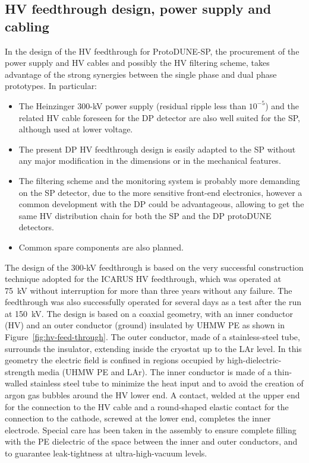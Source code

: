 
\subsection{HV feedthrough design, power supply and cabling}
In the design of the HV feedthrough for ProtoDUNE-SP, the procurement of the power supply and HV cables and possibly the HV filtering scheme, takes advantage of the strong synergies between the single phase and dual phase prototypes. In particular:

\begin{itemize}	
\item The Heinzinger 300-kV power supply (residual ripple less than $10^{-5}$) and the related HV cable foreseen for the DP detector are also well suited for the SP, although used at lower voltage.
\item The present DP HV feedthrough design is easily adapted to the SP without any major modification in the dimensions or in the mechanical features.
\item The filtering scheme and the monitoring system is probably more demanding on the SP detector, due to the more sensitive front-end electronics, however a common development with the DP could be advantageous, allowing to get the same HV distribution chain for both the SP and the DP protoDUNE detectors.
\item Common spare components are also planned. %
\end{itemize}

The %
design of the 300-kV feedthrough is based on the very successful construction technique adopted for the ICARUS HV feedthrough, which was operated at 75~kV without interruption for more than three years without any failure. The feedthrough was also successfully operated for several days as a test after the run at 150~kV.  
The design is based on a coaxial geometry, with an inner conductor (HV) and an outer conductor (ground) insulated by UHMW PE  as shown in Figure~\ref{fig:hv-feed-through}. The outer conductor, made of a stainless-steel tube, surrounds the insulator, extending inside the cryostat up to the LAr level. %
In this geometry the electric field is %
confined in regions occupied by high-dielectric-strength media (UHMW PE and LAr).  The inner conductor is made of a thin-walled stainless steel tube to minimize the heat input and to avoid the creation of argon gas bubbles around the HV lower end. A contact, welded at the upper end for the
connection to the HV cable and a round-shaped elastic contact for the connection to the cathode, screwed at the lower end, completes the inner electrode. Special care has been taken in the assembly to ensure complete filling with the PE dielectric of the space between the inner and outer conductors, and to guarantee leak-tightness at ultra-high-vacuum levels.


